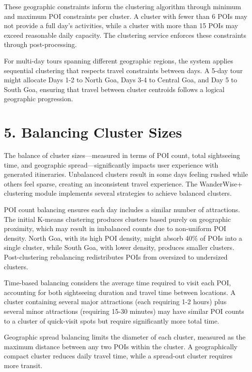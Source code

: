 These geographic constraints inform the clustering algorithm through minimum and maximum POI constraints per cluster. A cluster with fewer than 6 POIs may not provide a full day's activities, while a cluster with more than 15 POIs may exceed reasonable daily capacity. The clustering service enforces these constraints through post-processing.

For multi-day tours spanning different geographic regions, the system applies sequential clustering that respects travel constraints between days. A 5-day tour might allocate Days 1-2 to North Goa, Days 3-4 to Central Goa, and Day 5 to South Goa, ensuring that travel between cluster centroids follows a logical geographic progression.

\section{5. Balancing Cluster Sizes}

The balance of cluster sizes—measured in terms of POI count, total sightseeing time, and geographic spread—significantly impacts user experience with generated itineraries. Unbalanced clusters result in some days feeling rushed while others feel sparse, creating an inconsistent travel experience. The WanderWise+ clustering module implements several strategies to achieve balanced clusters.

POI count balancing ensures each day includes a similar number of attractions. The initial K-means clustering produces clusters based purely on geographic proximity, which may result in imbalanced counts due to non-uniform POI density. North Goa, with its high POI density, might absorb 40\% of POIs into a single cluster, while South Goa, with lower density, produces smaller clusters. Post-clustering rebalancing redistributes POIs from oversized to undersized clusters.

Time-based balancing considers the average time required to visit each POI, accounting for both sightseeing duration and travel time between locations. A cluster containing several major attractions (each requiring 1-2 hours) plus several minor attractions (requiring 15-30 minutes) may have similar POI counts to a cluster of quick-visit spots but require significantly more total time.

Geographic spread balancing limits the diameter of each cluster, measured as the maximum distance between any two POIs within the cluster. A geographically compact cluster reduces daily travel time, while a spread-out cluster requires more transit.

